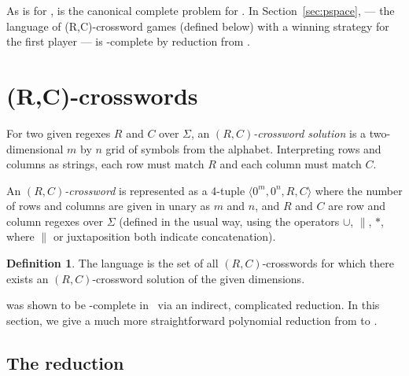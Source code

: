 \documentclass{article}
\newcommand{\0}{\mathbf{0}}
\newcommand{\1}{\mathbf{1}}
\newcommand{\2}{\mathbf{2}}
\newcommand{\TQBF}{\lang{TQBF}}
\newcommand{\RCG}{\lang{RCG}}
\newcommand{\tup}[1]{\langle{} #1 \rangle{}}
\newcounter{row}
\newcounter{col}
\theoremstyle{plain}
\theoremstyle{definition}
\newtheorem{definition}[theorem]{Definition}
\begin{document}
As  is for ,  is the canonical complete problem for . In Section~\ref{sec:pspace}, \RCG{} --- the language of (R,C)-crossword games (defined below) with a winning strategy for the first player --- is -complete by reduction from \TQBF{}.

\section{(R,C)-crosswords}\label{sec:np}
For two given regexes $R$ and $C$ over $\Sigma$, an \emph{$(R,C)$-crossword solution} is a two-dimensional $m$ by $n$ grid of symbols from the alphabet. Interpreting rows and columns as strings, each row must match $R$ and each column must match $C$.

An \emph{$(R,C)$-crossword} is represented as a 4-tuple $\tup{0^m, 0^n, R, C}$ where the number of rows and columns are given in unary as $m$ and $n$, and $R$ and $C$ are row and column regexes over $\Sigma$ (defined in the usual way, using the operators $\cup$, $\|$, $*$, where $\|$ or juxtaposition both indicate concatenation).

\begin{definition}
  The language  is the set of all $(R,C)$-crosswords for which there exists an $(R,C)$-crossword solution of the given dimensions.
\end{definition}

 was shown to be -complete
in~\cite{Fenner:regex-crossword} via an indirect, complicated reduction.  In this section, we give a much more straightforward polynomial reduction from  to .

\subsection{The reduction}
\end{document}

